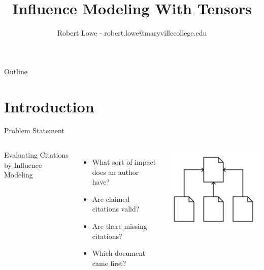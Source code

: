\documentclass{beamer}
\title{Influence Modeling With Tensors}
\author{Robert Lowe - robert.lowe@maryvillecollege.edu}
\date[]{}
\begin{document}
\begin{frame}
  \titlepage
\end{frame}

\begin{frame}{Outline}
  \tableofcontents
\end{frame}





\section{Introduction}
\begin{frame}{Problem Statement}
    \begin{columns}
        Evaluating Citations by Influence Modeling
        \begin{itemize}[<+->]
            \item What sort of impact does an author have?
            \item Are claimed citations valid?
            \item Are there missing citations?
            \item Which document came first?
        \end{itemize}
        \includegraphics[width=\textwidth]{images/Citations}
    \end{columns}
\end{frame}
\end{document}
